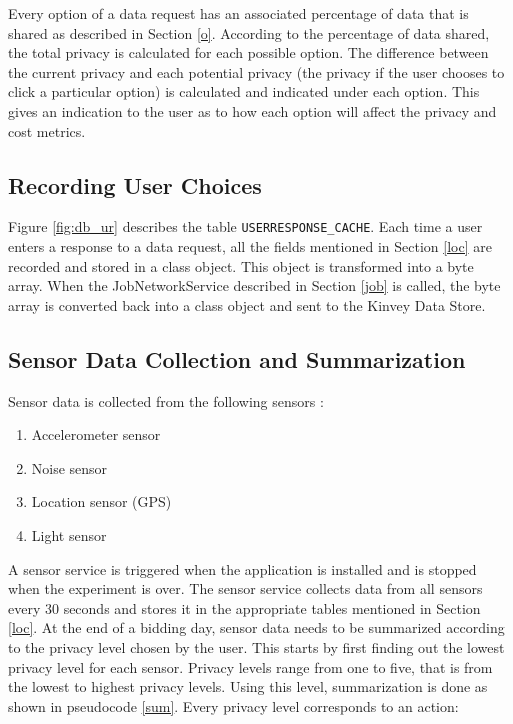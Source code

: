 Every option of a data request has an associated percentage of data that is shared as described in Section \ref{o}. According to the percentage of data shared, the total privacy is calculated for each possible option. The difference between the current privacy and each potential privacy (the privacy if the user chooses to click a particular option) is calculated and indicated under each option. This gives an indication to the user as to how each option will affect the privacy and cost metrics.

\subsection{Recording User Choices}

Figure \ref{fig:db_ur} describes the table \texttt{USERRESPONSE\_CACHE}. Each time a user enters a response to a data request, all the fields mentioned in Section
\ref{loc} are recorded and stored in a class object. This object is transformed into a byte array.
When the JobNetworkService described in Section \ref{job} is called, the byte array is converted back into a class object and sent to the Kinvey Data Store.

\subsection{Sensor Data Collection and Summarization} 

Sensor data is collected from the following sensors :

\begin{enumerate}
	\item Accelerometer sensor
	\item Noise sensor
    \item Location sensor (GPS)
    \item Light sensor
\end{enumerate}

A sensor service is triggered when the application is installed and is stopped when the experiment is over. The sensor service collects data from all sensors
every 30 seconds and stores it in the appropriate tables mentioned in Section \ref{loc}.
At the end of a bidding day, sensor data needs to be summarized according to the privacy level chosen by the user. This starts by first finding out the lowest privacy level for each sensor. Privacy levels range from one to five, that is from the lowest to highest privacy levels. Using this level,
summarization is done as shown in pseudocode \ref{sum}. Every privacy level corresponds to an action:

